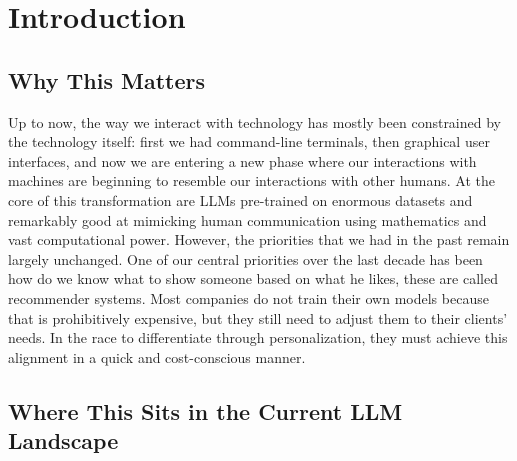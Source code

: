 %

\section{Introduction}
\label{sec:intro}

\subsection{Why This Matters}
\label{sec:intro:why}

Up to now, the way we interact with technology has mostly been constrained by the technology itself: first we had command-line terminals, then graphical user interfaces, and now we are entering a new phase where our interactions with machines are beginning to resemble our interactions with other humans. At the core of this transformation are LLMs pre-trained on enormous datasets and remarkably good at mimicking human communication using mathematics and vast computational power. However, the priorities that we had in the past remain largely unchanged. One of our central priorities over the last decade has been how do we know what to show someone based on what he likes, these are called recommender systems. Most companies do not train their own models because that is prohibitively expensive, but they still need to adjust them to their clients' needs. In the race to differentiate through personalization, they must achieve this alignment in a quick and cost-conscious manner.



\subsection{Where This Sits in the Current LLM Landscape}
\label{sec:intro:landscape}

